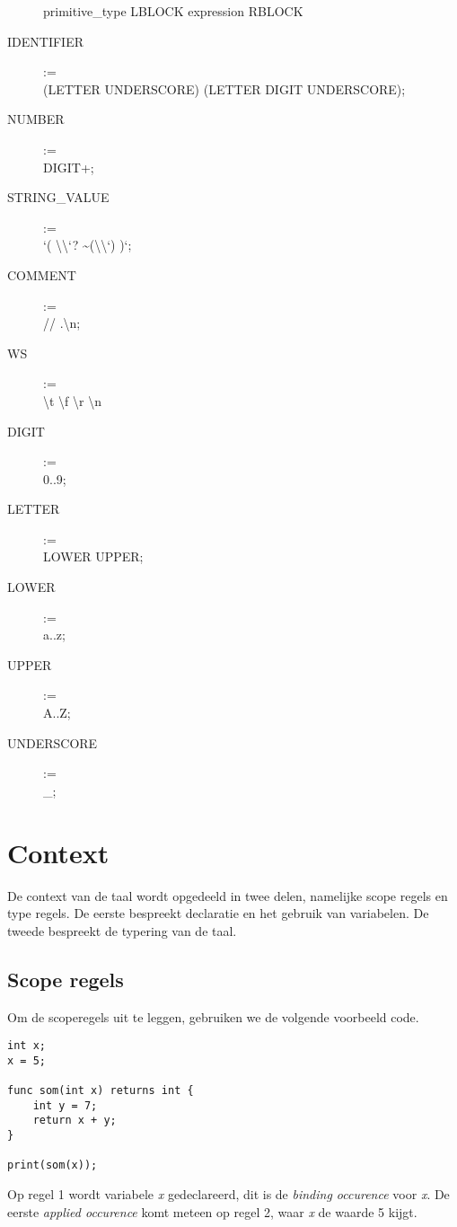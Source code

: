 \begin{description}
        primitive\_type LBLOCK expression RBLOCK
    \item[IDENTIFIER] := \hfill \\
        (LETTER \textbar UNDERSCORE) (LETTER \textbar DIGIT \textbar UNDERSCORE);
    \item[NUMBER] := \hfill \\
        DIGIT+;
    \item[STRING\_VALUE] := \hfill \\
        \textquoteleft ( \textbackslash\textbackslash \textquoteleft? \textbar \textasciitilde(\textbackslash\textbackslash \textbar \textquoteleft) )\textasteriskcentered \textquoteleft;
    \item[COMMENT] := \hfill \\
        // .\textasteriskcentered \textbackslash n;
    \item[WS] := \hfill \\
        \textvisiblespace \textbar \textbackslash t \textbar \textbackslash f \textbar \textbackslash r \textbar \textbackslash n
    \item[DIGIT] := \hfill \\
        0..9;
    \item[LETTER] := \hfill \\
        LOWER \textbar UPPER;
    \item[LOWER] := \hfill \\
        a..z;
    \item[UPPER] := \hfill \\
        A..Z;
    \item[UNDERSCORE] := \hfill \\
        \_; 
\end{description}

\section{Context} %
\label{sec:context}
De context van de taal wordt opgedeeld in twee delen, namelijke scope regels en type regels. De eerste bespreekt declaratie en het gebruik van variabelen. De tweede bespreekt de typering van de taal.

\subsection{Scope regels} %
\label{sub:scope_regels}
Om de scoperegels uit te leggen, gebruiken we de volgende voorbeeld code.
\begin{lstlisting}
int x;
x = 5;

func som(int x) returns int {
    int y = 7;
    return x + y;
}

print(som(x));
\end{lstlisting}
Op regel 1 wordt variabele \emph{x} gedeclareerd, dit is de \emph{binding occurence} voor \emph{x}. De eerste \emph{applied occurence} komt meteen op regel 2, waar \emph{x} de waarde 5 kijgt.

